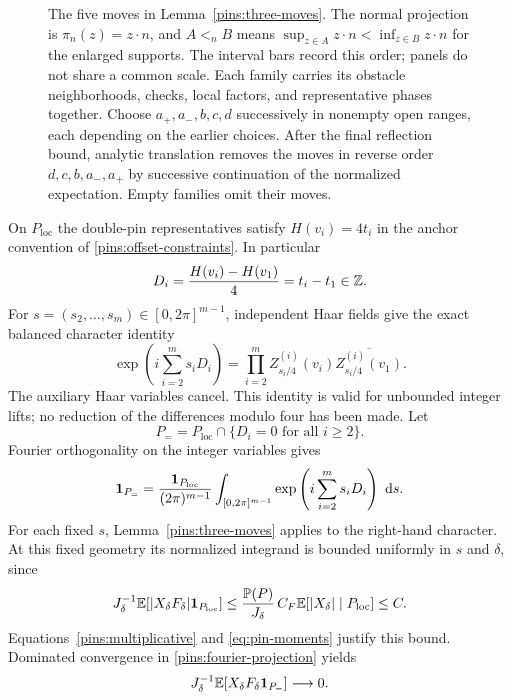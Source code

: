 \begin{figure}[!hbp]
\centering

\caption{The five moves in Lemma~\ref{pins:three-moves}.
The normal projection is $\pi_n(z)=z\cdot n$, and $A<_nB$ means
$\sup_{z\in A}z\cdot n<\inf_{z\in B}z\cdot n$ for the enlarged
supports.  The interval bars record this order; panels do not share a
common scale.  Each family carries its obstacle neighborhoods, checks,
local factors, and representative phases together.  Choose
$a_+,a_-,b,c,d$ successively in nonempty open ranges, each depending on
the earlier choices.  After the final reflection bound, analytic
translation removes the moves in reverse order $d,c,b,a_-,a_+$ by
successive continuation of the normalized expectation.  Empty families
omit their moves.}
\label{fig:pins-five-moves}
\end{figure}

On $P_{\mathrm{loc}}$ the double-pin representatives satisfy
$H(v_i)=4t_i$ in the anchor convention of
\eqref{pins:offset-constraints}.  In particular
\[
 D_i=\frac{H(v_i)-H(v_1)}4=t_i-t_1\in\mathbb Z.
\]
For $s=(s_2,\ldots,s_m)\in[0,2\pi]^{m-1}$, independent Haar
fields give the exact balanced character identity
\begin{equation}\label{pins:balanced-characters}
 \exp\left(i\sum_{i=2}^m s_i D_i\right)
 =\prod_{i=2}^m
 Z^{(i)}_{s_i/4}(v_i)\overline{Z^{(i)}_{s_i/4}(v_1)}.
\end{equation}
The auxiliary Haar variables cancel.  This identity is valid for
unbounded integer lifts; no reduction of the differences modulo four
has been made.  Let
\begin{equation}\label{pins:common-offset-event}
 P_= =P_{\mathrm{loc}}\cap\{D_i=0\text{ for all }i\ge2\}.
\end{equation}
Fourier orthogonality on the integer variables gives
\begin{equation}\label{pins:fourier-projection}
 \mathbf 1_{P_=}=
 \frac{\mathbf 1_{P_{\mathrm{loc}}}}{(2\pi)^{m-1}}
 \int_{[0,2\pi]^{m-1}}
       \exp\left(i\sum_{i=2}^m s_iD_i\right)\,\,\mathrm d s.
\end{equation}
For each fixed $s$, Lemma~\ref{pins:three-moves} applies to the
right-hand character.  At this fixed geometry its normalized integrand
is bounded uniformly in $s$ and $\delta$, since
\[
 J_\delta^{-1}\mathbb E[|X_\delta F_\delta|\mathbf 1_{P_{\mathrm{loc}}}]
 \le \frac{\mathbb P(P)}{J_\delta}\,C_F
       \mathbb E[|X_\delta|\mid P_{\mathrm{loc}}]\le C.
\]
Equations~\eqref{pins:multiplicative} and \eqref{eq:pin-moments}
justify this bound.  Dominated convergence in
\eqref{pins:fourier-projection} yields
\begin{equation}\label{pins:common-offset-numerator}
 J_\delta^{-1}\mathbb E[X_\delta F_\delta\mathbf 1_{P_=}]
 \longrightarrow0.
\end{equation}

